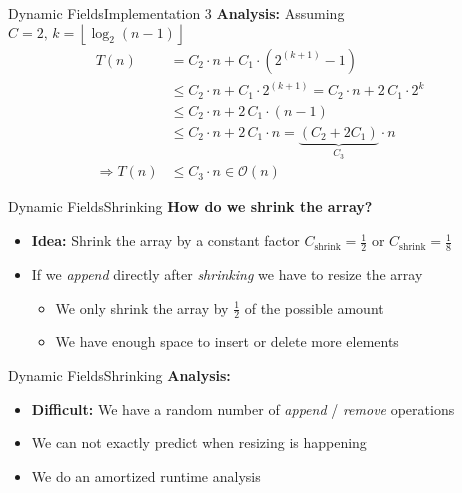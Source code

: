 
\begin{frame}{Dynamic Fields}{Implementation 3}
  \textbf{Analysis:}
  Assuming $C = 2, \, k = \left\lfloor\log_2(n-1)\right\rfloor$
  \begin{align*}
    T(n) &= C_2 \cdot n + C_1 \cdot (2^{(k+1)}-1)\\
    {} &\leq C_2 \cdot n + C_1 \cdot 2^{(k+1)}
      = C_2 \cdot n + 2 \, C_1 \cdot 2^{k}\\
    {} &\leq C_2 \cdot n + 2 \, C_1 \cdot (n - 1)\\
    {} &\leq C_2 \cdot n + 2 \, C_1 \cdot n
      = \underbrace{(C_2 + 2 C_1)}_{C_3} \cdot n\\
    \Rightarrow T(n) &\leq C_3 \cdot n \in \mathcal{O}(n)
  \end{align*}
\end{frame}


\begin{frame}{Dynamic Fields}{Shrinking}
  \textbf{How do we shrink the array?}
  \begin{itemize}
    \item
      \textbf{Idea:}
      Shrink the array by a constant factor
      $C_\text{shrink} = \frac{1}{2}$ or $C_\text{shrink} = \frac{1}{8}$
    \item
      If we \textit{append} directly after \textit{shrinking} we have to
      resize the array
      \begin{itemize}
        \item
          We only shrink the array by $\frac{1}{2}$ of the possible amount
        \item
          We have enough space to insert or delete more elements
       \end{itemize}
  \end{itemize}
\end{frame}


\begin{frame}{Dynamic Fields}{Shrinking}
  \textbf{Analysis:}
  \begin{itemize}
    \item
      \textbf{Difficult:}
      We have a random number of \textit{append} / \textit{remove} operations
    \item
      We can not exactly predict when resizing is happening
    \item
      We do an amortized runtime analysis \cite{wikipedia_amortized_analysis}
  \end{itemize}
\end{frame}